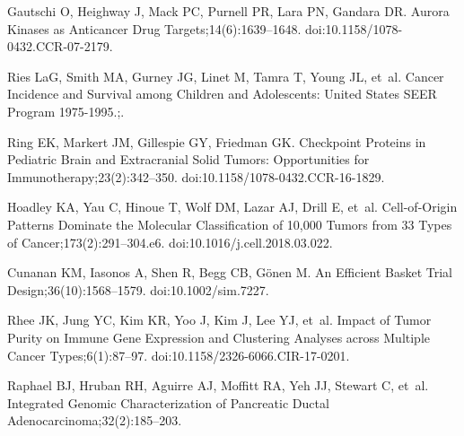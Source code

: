 \documentclass[10pt,letterpaper]{article}
\begin{document}
\begin{thebibliography}{10}
	Gautschi O, Heighway J, Mack PC, Purnell PR, Lara PN, Gandara DR.
	\newblock Aurora {{Kinases}} as {{Anticancer Drug Targets}};14(6):1639--1648.
	\newblock doi:{10.1158/1078-0432.CCR-07-2179}.
	
	Ries LaG, Smith MA, Gurney JG, Linet M, Tamra T, Young JL, et~al.
	\newblock Cancer Incidence and Survival among Children and Adolescents:
	{{United States SEER Program}} 1975-1995.;.
	
	Ring EK, Markert JM, Gillespie GY, Friedman GK.
	\newblock Checkpoint {{Proteins}} in {{Pediatric Brain}} and {{Extracranial
			Solid Tumors}}: {{Opportunities}} for {{Immunotherapy}};23(2):342--350.
	\newblock doi:{10.1158/1078-0432.CCR-16-1829}.
	
	Hoadley KA, Yau C, Hinoue T, Wolf DM, Lazar AJ, Drill E, et~al.
	\newblock Cell-of-{{Origin Patterns Dominate}} the {{Molecular Classification}}
	of 10,000 {{Tumors}} from 33 {{Types}} of {{Cancer}};173(2):291--304.e6.
	\newblock doi:{10.1016/j.cell.2018.03.022}.
	
	Cunanan KM, Iasonos A, Shen R, Begg CB, Gönen M.
	\newblock An {{Efficient Basket Trial Design}};36(10):1568--1579.
	\newblock doi:{10.1002/sim.7227}.
	
	Rhee JK, Jung YC, Kim KR, Yoo J, Kim J, Lee YJ, et~al.
	\newblock Impact of {{Tumor Purity}} on {{Immune Gene Expression}} and
	{{Clustering Analyses}} across {{Multiple Cancer Types}};6(1):87--97.
	\newblock doi:{10.1158/2326-6066.CIR-17-0201}.
	
	Raphael BJ, Hruban RH, Aguirre AJ, Moffitt RA, Yeh JJ, Stewart C, et~al.
	\newblock Integrated Genomic Characterization of Pancreatic Ductal
	Adenocarcinoma;32(2):185--203.
	
\end{thebibliography}
\end{document}
